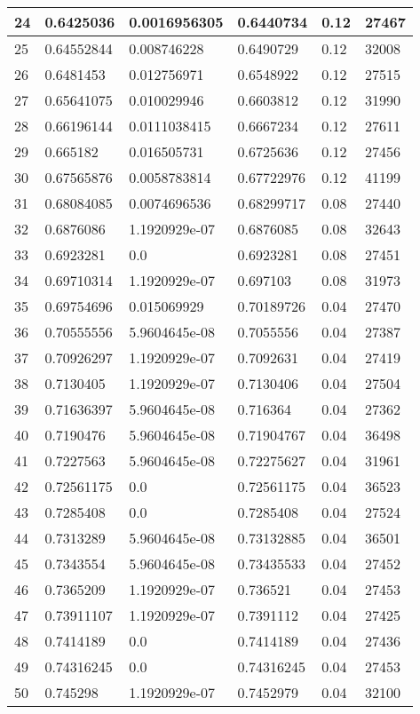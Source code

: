 \begin{longtable}{|l|l|l|l|l|l|}
24 & 0.6425036 & 0.0016956305 & 0.6440734 & 0.12 & 27467 \\ \hline 
25 & 0.64552844 & 0.008746228 & 0.6490729 & 0.12 & 32008 \\ \hline 
26 & 0.6481453 & 0.012756971 & 0.6548922 & 0.12 & 27515 \\ \hline 
27 & 0.65641075 & 0.010029946 & 0.6603812 & 0.12 & 31990 \\ \hline 
28 & 0.66196144 & 0.0111038415 & 0.6667234 & 0.12 & 27611 \\ \hline 
29 & 0.665182 & 0.016505731 & 0.6725636 & 0.12 & 27456 \\ \hline 
30 & 0.67565876 & 0.0058783814 & 0.67722976 & 0.12 & 41199 \\ \hline 
31 & 0.68084085 & 0.0074696536 & 0.68299717 & 0.08 & 27440 \\ \hline 
32 & 0.6876086 & 1.1920929e-07 & 0.6876085 & 0.08 & 32643 \\ \hline 
33 & 0.6923281 & 0.0 & 0.6923281 & 0.08 & 27451 \\ \hline 
34 & 0.69710314 & 1.1920929e-07 & 0.697103 & 0.08 & 31973 \\ \hline 
35 & 0.69754696 & 0.015069929 & 0.70189726 & 0.04 & 27470 \\ \hline 
36 & 0.70555556 & 5.9604645e-08 & 0.7055556 & 0.04 & 27387 \\ \hline 
37 & 0.70926297 & 1.1920929e-07 & 0.7092631 & 0.04 & 27419 \\ \hline 
38 & 0.7130405 & 1.1920929e-07 & 0.7130406 & 0.04 & 27504 \\ \hline 
39 & 0.71636397 & 5.9604645e-08 & 0.716364 & 0.04 & 27362 \\ \hline 
40 & 0.7190476 & 5.9604645e-08 & 0.71904767 & 0.04 & 36498 \\ \hline 
41 & 0.7227563 & 5.9604645e-08 & 0.72275627 & 0.04 & 31961 \\ \hline 
42 & 0.72561175 & 0.0 & 0.72561175 & 0.04 & 36523 \\ \hline 
43 & 0.7285408 & 0.0 & 0.7285408 & 0.04 & 27524 \\ \hline 
44 & 0.7313289 & 5.9604645e-08 & 0.73132885 & 0.04 & 36501 \\ \hline 
45 & 0.7343554 & 5.9604645e-08 & 0.73435533 & 0.04 & 27452 \\ \hline 
46 & 0.7365209 & 1.1920929e-07 & 0.736521 & 0.04 & 27453 \\ \hline 
47 & 0.73911107 & 1.1920929e-07 & 0.7391112 & 0.04 & 27425 \\ \hline 
48 & 0.7414189 & 0.0 & 0.7414189 & 0.04 & 27436 \\ \hline 
49 & 0.74316245 & 0.0 & 0.74316245 & 0.04 & 27453 \\ \hline 
50 & 0.745298 & 1.1920929e-07 & 0.7452979 & 0.04 & 32100 \\ \hline 
\end{longtable}